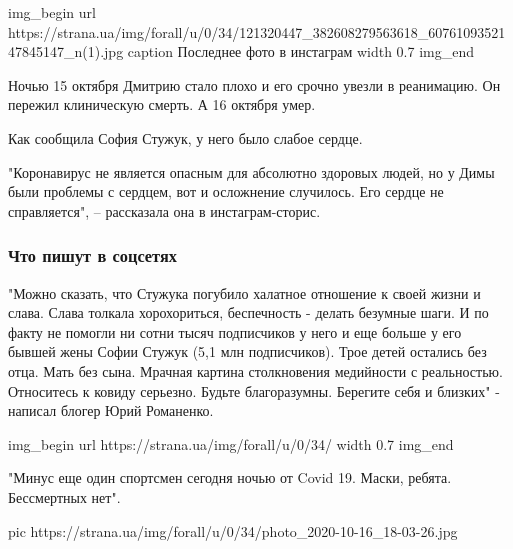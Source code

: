 \ifcmt
img_begin 
	url https://strana.ua/img/forall/u/0/34/121320447_382608279563618_6076109352147845147_n(1).jpg
	caption Последнее фото в инстаграм
	width 0.7
img_end
\fi

Ночью 15 октября Дмитрию стало плохо и его срочно увезли в
реанимацию. Он пережил клиническую смерть. А 16 октября умер.

Как сообщила София Стужук, у него было слабое сердце. 

"Коронавирус не является опасным для абсолютно здоровых людей, но у
Димы были проблемы с сердцем, вот и осложнение случилось. Его сердце
не справляется", – рассказала она в инстаграм-сторис.

\subsubsection{Что пишут в соцсетях}

"Можно сказать, что Стужука погубило халатное отношение к своей жизни
и слава. Слава толкала хорохориться, беспечность - делать безумные
шаги. И по факту не помогли ни сотни тысяч подписчиков у него и еще
больше у его бывшей жены Софии Стужук (5,1 млн подписчиков). Трое
детей остались без отца. Мать без сына. Мрачная картина столкновения
медийности с реальностью. Относитесь к ковиду серьезно. Будьте
благоразумны. Берегите себя и близких" - написал блогер Юрий
Романенко.

\ifcmt
img_begin 
	url https://strana.ua/img/forall/u/0/34/%
	width 0.7
img_end
\fi

"Минус еще один спортсмен сегодня ночью от Covid 19. Маски, ребята.
Бессмертных нет".

\ifcmt
pic https://strana.ua/img/forall/u/0/34/photo_2020-10-16_18-03-26.jpg
\fi
